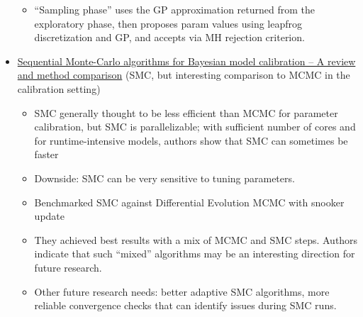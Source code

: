 \documentclass[12pt]{article}
\begin{document}
\begin{itemize}
\begin{itemize}
	\item ``Sampling phase'' uses the GP approximation returned from the exploratory phase, then proposes param values using leapfrog discretization and GP, and accepts via MH rejection criterion.
	\end{itemize}
\item \href{https://www.sciencedirect.com/science/article/pii/S0304380021001708}{Sequential Monte-Carlo algorithms for Bayesian model calibration – A review and method comparison} 
(SMC, but interesting comparison to MCMC in the calibration setting)
	\begin{itemize}
	\item SMC generally thought to be less efficient than MCMC for parameter calibration, but SMC is parallelizable; with sufficient number of cores and for runtime-intensive models, authors show that SMC can sometimes be faster
	\item Downside: SMC can be very sensitive to tuning parameters.
	\item Benchmarked SMC against Differential Evolution MCMC with snooker update
	\item They achieved best results with a mix of MCMC and SMC steps. Authors indicate that such ``mixed'' algorithms may be an interesting direction for future research.  
	\item Other future research needs: better adaptive SMC algorithms, more reliable convergence checks that can identify issues during SMC runs. 
	\end{itemize}
\end{itemize}
\end{document}
